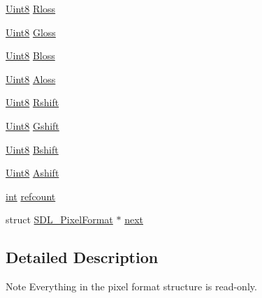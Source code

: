 \begin{DoxyCompactItemize}
\item 
\mbox{\hyperlink{_s_d_l__stdinc_8h_a2944638813a090aa23e62f4da842c3e2}{Uint8}} \mbox{\hyperlink{struct_s_d_l___pixel_format_a9994b4ed87a2551253aebfa191db8424}{Rloss}}
\item 
\mbox{\hyperlink{_s_d_l__stdinc_8h_a2944638813a090aa23e62f4da842c3e2}{Uint8}} \mbox{\hyperlink{struct_s_d_l___pixel_format_a94469768d8436e631a13d68623ff663f}{Gloss}}
\item 
\mbox{\hyperlink{_s_d_l__stdinc_8h_a2944638813a090aa23e62f4da842c3e2}{Uint8}} \mbox{\hyperlink{struct_s_d_l___pixel_format_a337072c1bc8b41efdd2da4e95b8c2ff7}{Bloss}}
\item 
\mbox{\hyperlink{_s_d_l__stdinc_8h_a2944638813a090aa23e62f4da842c3e2}{Uint8}} \mbox{\hyperlink{struct_s_d_l___pixel_format_a660e95097874088292f1289a458efaa2}{Aloss}}
\item 
\mbox{\hyperlink{_s_d_l__stdinc_8h_a2944638813a090aa23e62f4da842c3e2}{Uint8}} \mbox{\hyperlink{struct_s_d_l___pixel_format_abfdec7b9ee2ee39db630f4022e4e0daa}{Rshift}}
\item 
\mbox{\hyperlink{_s_d_l__stdinc_8h_a2944638813a090aa23e62f4da842c3e2}{Uint8}} \mbox{\hyperlink{struct_s_d_l___pixel_format_a6045012f994c02a86bdc4a91b28d2a3c}{Gshift}}
\item 
\mbox{\hyperlink{_s_d_l__stdinc_8h_a2944638813a090aa23e62f4da842c3e2}{Uint8}} \mbox{\hyperlink{struct_s_d_l___pixel_format_a4212574b67529628d8822ed4eb109754}{Bshift}}
\item 
\mbox{\hyperlink{_s_d_l__stdinc_8h_a2944638813a090aa23e62f4da842c3e2}{Uint8}} \mbox{\hyperlink{struct_s_d_l___pixel_format_ac3c4ffa0de1f2c94040340deede3bf46}{Ashift}}
\item 
\mbox{\hyperlink{warnings_8h_a74f207b5aa4ba51c3a2ad59b219a423b}{int}} \mbox{\hyperlink{struct_s_d_l___pixel_format_a23be8060443d58064a720a4e2ef31729}{refcount}}
\item 
struct \mbox{\hyperlink{struct_s_d_l___pixel_format}{S\+D\+L\+\_\+\+Pixel\+Format}} $\ast$ \mbox{\hyperlink{struct_s_d_l___pixel_format_a1953b66c817116bf81bae4873ee6bce5}{next}}
\end{DoxyCompactItemize}


\subsection{Detailed Description}
\begin{DoxyNote}{Note}
Everything in the pixel format structure is read-\/only. 
\end{DoxyNote}


